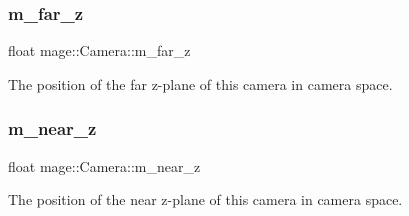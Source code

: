\subsubsection{\texorpdfstring{m\+\_\+far\+\_\+z}{m\_far\_z}}
{\footnotesize\ttfamily float mage\+::\+Camera\+::m\+\_\+far\+\_\+z\hspace{0.3cm}{\ttfamily [private]}}

The position of the far z-\/plane of this camera in camera space. \hypertarget{classmage_1_1_camera_a685f8700a29d1f1eff2bec353c3ec970}{}\label{classmage_1_1_camera_a685f8700a29d1f1eff2bec353c3ec970} 
\subsubsection{\texorpdfstring{m\+\_\+near\+\_\+z}{m\_near\_z}}
{\footnotesize\ttfamily float mage\+::\+Camera\+::m\+\_\+near\+\_\+z\hspace{0.3cm}{\ttfamily [private]}}

The position of the near z-\/plane of this camera in camera space. 